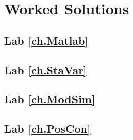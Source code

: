 
\chapter{Worked Solutions}

\section{Lab \ref{ch.Matlab}}

\section{Lab \ref{ch.StaVar}}

\section{Lab \ref{ch.ModSim}}

\section{Lab \ref{ch.PosCon}}
